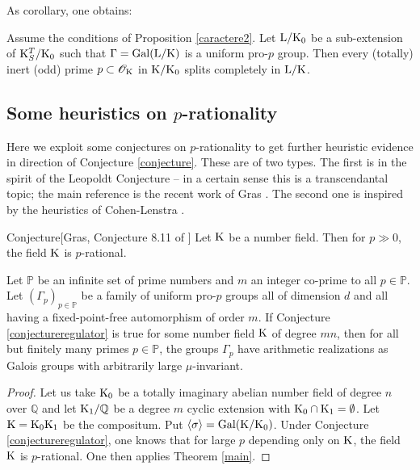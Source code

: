 \documentclass[12pt,a4paper,twoside,english]{smfart}
\def\K{{\rm K}}
\def\L{{\rm L}}
\def\Q{{\mathbb Q}}
\def\PP{{\mathbb P}}
\def\O{{\mathcal O}}
\def\p{{\mathfrak p}}
\def\Gal{{\rm Gal}}
\newenvironment{conjecture}{\begin{enonce}{Conjecture}}{\end{enonce}}
\begin{document}
As corollary, one obtains:

\begin{coro}
Assume the conditions of Proposition \ref{caractere2}. Let  $\L/\K_0$ be a sub-extension of   $\K_S^T/\K_0$ such that  $\Gamma = \Gal(\L/\K)$ is a uniform pro-$p$ group. Then every (totally) inert (odd) prime $\p \subset \O_\K$ in $\K/\K_0$ splits completely in $\L/\K$.
\end{coro}






\subsection{Some heuristics on  $p$-rationality}

Here we exploit some conjectures on $p$-rationality to get further heuristic evidence in direction of Conjecture \ref{conjecture}.
These are of two types. The first is in the spirit of the Leopoldt Conjecture -- in a certain sense this is a transcendantal topic; the main reference is the recent work of Gras \cite{gras-heuristics}.
The second one is inspired by the heuristics of Cohen-Lenstra \cite{Cohen-Lenstra}.



\begin{conjecture}[Gras, Conjecture 8.11 of \cite{gras-heuristics}]\label{conjectureregulator}
Let $\K$ be a number field. Then for  $p \gg 0$, the field $\K$ is $p$-rational.
\end{conjecture}


\begin{prop}\label{enfamille} Let $\PP$ be an infinite set of prime numbers and $m$ an integer  co-prime to all $p\in \PP$.
Let $(\Gamma_p)_{p \in \PP}$ be a family of uniform pro-$p$ groups all of dimension $d$ and all having a fixed-point-free automorphism of order $m$.
If Conjecture \ref{conjectureregulator} is true for some number field $\K$ of degree  $m n$, then for all but finitely many primes $p\in \PP$, the groups $\Gamma_p$ have arithmetic realizations as Galois groups with arbitrarily large $\mu$-invariant.
\end{prop}

\begin{proof}
Let us take $\K_0$ be a totally imaginary abelian number field of degree $n$ over $\Q$ and let $\K_1/\Q$ be a degree $m$ cyclic extension  with $\K_0\cap \K_1=\emptyset$. Let $\K=\K_0\K_1$ be the compositum.
Put $\langle \sigma \rangle=\Gal(\K/\K_0)$. Under Conjecture \ref{conjectureregulator}, one knows that for large $p$ depending only on $\K$, the field $\K$ is $p$-rational. One then applies Theorem \ref{main}.
\end{proof}
\end{document}
